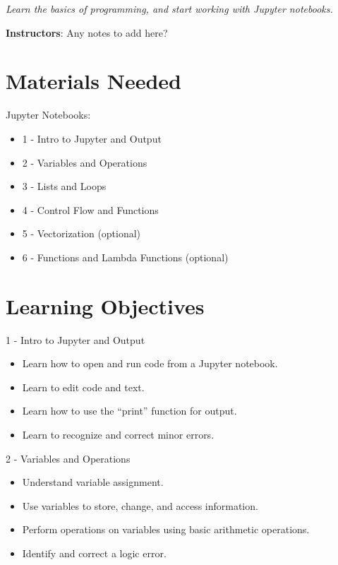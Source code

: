 \documentclass[11pt]{article}
\begin{document}


\Pfrontheader  
\SetBgContents{\PtikzHead} %



\emph{Learn the basics of programming, and start working with Jupyter notebooks.} 

\textbf{Instructors}: {\color{red}Any notes to add here? }

\section*{Materials Needed}

Jupyter Notebooks:
\begin{itemize}
\item 1 - Intro to Jupyter and Output
\item 2 - Variables and Operations
\item 3 - Lists and Loops
\item 4 - Control Flow and Functions
\item 5 - Vectorization (optional)
\item 6 - Functions and Lambda Functions (optional)
\end{itemize}

\section*{Learning Objectives}

1 - Intro to Jupyter and Output
\begin{itemize}
\item Learn how to open and run code from a Jupyter notebook.
\item Learn to edit code and text.
\item Learn how to use the ``print'' function for output.
\item Learn to recognize and correct minor errors.
\end{itemize}

2 - Variables and Operations
\begin{itemize}
\item Understand variable assignment.
\item Use variables to store, change, and access information.
\item Perform operations on variables using basic arithmetic operations.
\item Identify and correct a logic error.
\end{itemize}
\end{document}
